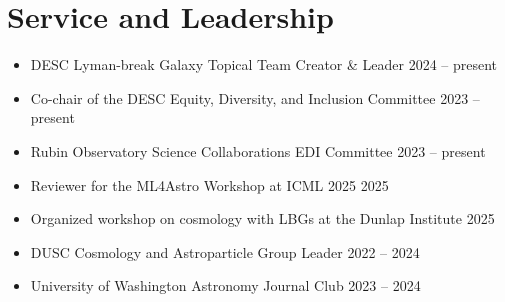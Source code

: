 \section{Service and Leadership}
\begin{itemize}
    \item DESC Lyman-break Galaxy Topical Team Creator \& Leader \hfill 2024 -- present

    \item Co-chair of the DESC Equity, Diversity, and Inclusion Committee \hfill 2023 -- present

    \item Rubin Observatory Science Collaborations EDI Committee \hfill 2023 -- present

    \item Reviewer for the ML4Astro Workshop at ICML 2025 \hfill 2025

    \item Organized workshop on cosmology with LBGs at the Dunlap Institute \hfill 2025

    \item DUSC Cosmology and Astroparticle Group Leader \hfill 2022 -- 2024

    \item University of Washington Astronomy Journal Club \hfill 2023 -- 2024


\end{itemize}
